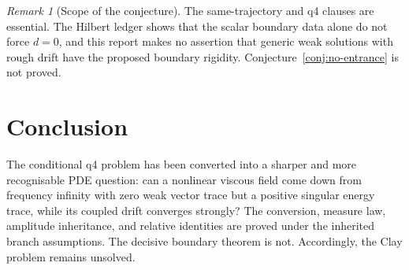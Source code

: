 \documentclass[11pt]{article}
\theoremstyle{remark}
\newtheorem{remark}[theorem]{Remark}
\begin{document}
\begin{remark}[Scope of the conjecture]
The same-trajectory and q4 clauses are essential.  The Hilbert ledger
shows that the scalar boundary data alone do not force \(d=0\), and this
report makes no assertion that generic weak solutions with rough drift
have the proposed boundary rigidity.  Conjecture~\ref{conj:no-entrance}
is not proved.
\end{remark}

\section*{Conclusion}

The conditional q4 problem has been converted into a sharper and more
recognisable PDE question: can a nonlinear viscous field come down from
frequency infinity with zero weak vector trace but a positive singular
energy trace, while its coupled drift converges strongly?  The conversion,
measure law, amplitude inheritance, and relative identities are proved
under the inherited branch assumptions.  The decisive boundary theorem is
not.  Accordingly, the Clay problem remains unsolved.
\end{document}

